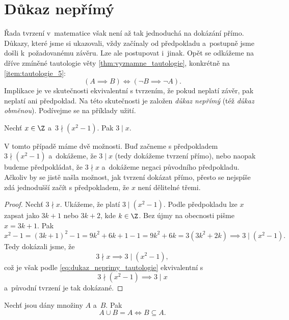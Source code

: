 \section{Důkaz nepřímý}\label{sec:dukaz_neprimy}
Řada tvrzení v~matematice však není až tak jednoduchá na dokázání přímo. Důkazy, které jsme si ukazovali, vždy začínaly od předpokladu a~postupně jsme došli k~požadovanému závěru. Lze ale postupovat i~jinak. Opět se odkážeme na dříve zmíněné tautologie věty \ref{thm:vyznamne_tautologie}, konkrétně na \ref{item:tautologie_5}:
\begin{equation}\label{eq:dukaz_neprimy_tautologie}
    (A \implies B) \iff (\neg B \implies \neg A).
\end{equation}
Implikace je ve skutečnosti ekvivalentní s tvrzením, že pokud neplatí závěr, pak neplatí ani předpoklad. Na této skutečnosti je založen \emph{důkaz nepřímý} (též \emph{důkaz obměnou}). Podívejme se na příklady užití.
\begin{proposition}
    Nechť $x\in\Z$ a~$3 \nmid (x^2-1)$. Pak $3 \mid x$.
\end{proposition}
V tomto případě máme dvě možnosti. Buď začneme s předpokladem $3 \nmid (x^2-1)$ a~dokážeme, že $3 \mid x$ (tedy dokážeme tvrzení přímo), nebo naopak budeme předpokládat, že $3 \nmid x$ a~dokážeme negaci původního předpokladu. Ačkoliv by se jistě našla možnost, jak tvrzení dokázat přímo, přesto se nejspíše zdá jednodušší začít s předpokladem, že $x$ není dělitelné třemi.
\begin{proof}
    Nechť $3 \nmid x$. Ukážeme, že platí $3 \mid (x^2-1)$. Podle předpokladu lze $x$ zapsat jako $3k+1$ nebo $3k+2$, kde $k\in\Z$. Bez újmy na obecnosti pišme $x=3k+1$. Pak
    \begin{equation*}
        x^2-1=(3k+1)^2-1=9k^2+6k+1-1=9k^2+6k=3(3k^2+2k)\implies 3 \mid (x^2-1).
    \end{equation*}
    Tedy dokázali jsme, že
    \begin{equation*}
        3 \nmid x \implies 3 \mid (x^2-1),
    \end{equation*}
    což je však podle \ref{eq:dukaz_neprimy_tautologie} ekvivalentní s
    \begin{equation*}
        3 \nmid (x^2-1) \implies 3 \mid x
    \end{equation*}
    a~původní tvrzení je tak dokázané.
\end{proof}
\begin{proposition}
    Nechť jsou dány množiny $A$ a~$B$. Pak
    \begin{equation*}
        A \cup B=A \iff B \subseteq A.
    \end{equation*}
\end{proposition}
